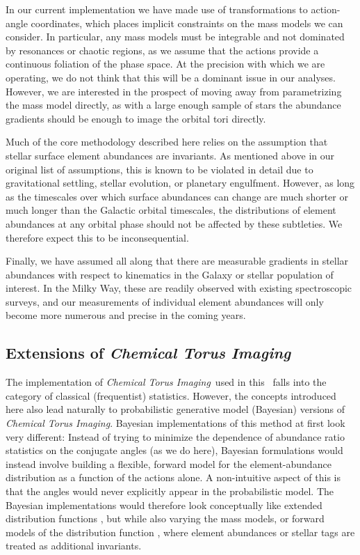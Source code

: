 \documentclass[modern]{aastex63}
\newcommand{\methodname}{\textsl{Chemical Torus Imaging}}
\begin{document}
In our current implementation we have made use of transformations to
action-angle coordinates, which places implicit constraints on the mass models
we can consider.
In particular, any mass models must be integrable and not dominated by
resonances or chaotic regions, as we assume that the actions provide a
continuous foliation of the phase space.
At the precision with which we are operating, we do not think that this will be
a dominant issue in our analyses.
However, we are interested in the prospect of moving away from parametrizing the
mass model directly, as with a large enough sample of stars the abundance
gradients should be enough to image the orbital tori directly.

Much of the core methodology described here relies on the assumption that
stellar surface element abundances are invariants.
As mentioned above in our original list of assumptions, this is known to be
violated in detail due to gravitational settling, stellar evolution, or
planetary engulfment.
However, as long as the timescales over which surface abundances can change are
much shorter or much longer than the Galactic orbital timescales, the
distributions of element abundances at any orbital phase should not be affected
by these subtleties.
We therefore expect this to be inconsequential.

Finally, we have assumed all along that there are measurable gradients in
stellar abundances with respect to kinematics in the Galaxy or stellar
population of interest.
In the Milky Way, these are readily observed with existing spectroscopic
surveys, and our measurements of individual element abundances will only become
more numerous and precise in the coming years.


\subsection{Extensions of \methodname}

The implementation of \methodname\ used in this \documentname\ falls into the
category of classical (frequentist) statistics.
However, the concepts introduced here also lead naturally to probabilistic
generative model (Bayesian) versions of \methodname.
Bayesian implementations of this method at first look very different:
Instead of trying to minimize the dependence of abundance ratio statistics on
the conjugate angles (as we do here), Bayesian formulations would instead
involve building a flexible, forward model for the element-abundance
distribution as a function of the actions alone.
A non-intuitive aspect of this is that the angles would never explicitly appear
in the probabilistic model.
The Bayesian implementations would therefore look conceptually like extended
distribution functions \citep{Sanders:2015}, but while also varying the mass
models, or forward models of the distribution function
\citep[e.g.,][]{Magorrian:2014}, where element abundances or stellar tags are
treated as additional invariants.
\end{document}

